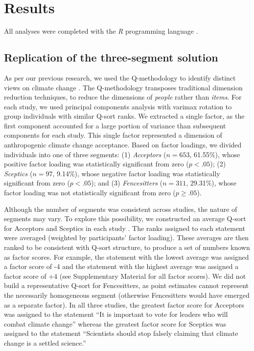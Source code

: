 \documentclass[
  letterpaper,
  DIV=11,
  numbers=noendperiod]{scrartcl}
\begin{document}
\hypertarget{results}{%
\section{Results}\label{results}}

All analyses were completed with the \emph{R} programming language
\citep{rcoreteam_2023}.

\hypertarget{replication-of-the-three-segment-solution}{%
\subsection{Replication of the three-segment
solution}\label{replication-of-the-three-segment-solution}}

As per our previous research, we used the Q-methodology to identify
distinct views on climate change \citep{brown1980}. The Q-methodology
transposes traditional dimension reduction techniques, to reduce the
dimensions of \emph{people} rather than \emph{items}. For each study, we
used principal components analysis with varimax rotation to group
individuals with similar Q-sort ranks. We extracted a single factor, as
the first component accounted for a large portion of variance than
subsequent components for each study. This single factor represented a
dimension of anthropogenic climate change acceptance. Based on factor
loadings, we divided individuals into one of three segments: (1)
\emph{Acceptors} (\(n = 653\), 61.55\%), whose positive factor loading
was statistically significant from zero (\(p < .05\)); (2)
\emph{Sceptics} (\(n = 97\), 9.14\%), whose negative factor loading was
statistically significant from zero (\(p < .05\)); and (3)
\emph{Fencesitters} (\(n = 311\), 29.31\%), whose factor loading was not
statistically significant from zero (\(p \ge .05\)).

Although the number of segments was consistent across studies, the
nature of segments may vary. To explore this possibility, we constructed
an average Q-sort for Acceptors and Sceptics in each study
\citep{brown1980}. The ranks assigned to each statement were averaged
(weighted by participants' factor loading). These averages are then
ranked to be consistent with Q-sort structure, to produce a set of
numbers known as factor scores. For example, the statement with the
lowest average was assigned a factor score of -4 and the statement with
the highest average was assigned a factor score of +4 (see Supplementary
Material for all factor scores). We did not build a representative
Q-sort for Fencesitters, as point estimates cannot represent the
necessarily homogeneous segment (otherwise Fencesitters would have
emerged as a separate factor). In all three studies, the greatest factor
score for Acceptors was assigned to the statement ``It is important to
vote for leaders who will combat climate change'' whereas the greatest
factor score for Sceptics was assigned to the statement ``Scientists
should stop falsely claiming that climate change is a settled science.''
\end{document}
